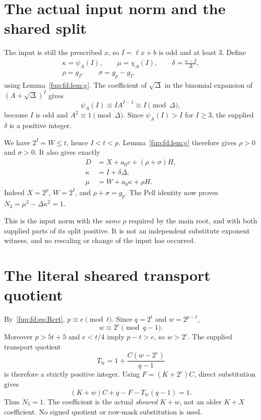 \documentclass[11pt,letterpaper]{article}
\theoremstyle{definition}\newtheorem{definition}[theorem]{Definition}
\theoremstyle{remark}\newtheorem{remark}[theorem]{Remark}
\newcommand{\tr}{T_{\mathrm{tr}}}\newcommand{\ma}{m_{\mathrm{aux}}}
\begin{document}
\section{The actual input norm and the shared split}\label{fup:fd:sec:input}
The input is still the prescribed $x$, so $I=\ell x+b$ is odd and at least 3. Define
\begin{equation}\label{fup:fd:eq:inputconstruction}
 \begin{gathered}
 \kappa=\psi_A(I),\qquad\mu=\chi_A(I),\qquad
 \delta=\frac{\kappa-I}{\Delta},\\
 \rho=g_I,\qquad\sigma=g_p-g_I,
 \end{gathered}
\end{equation}
using Lemma~\ref{fup:fd:lem:g}. The coefficient of $\sqrt\Delta$ in the binomial expansion of $(A+\sqrt\Delta)^I$ gives
\[
 \psi_A(I)\equiv I A^{I-1}\equiv I\pmod\Delta,
\]
because $I$ is odd and $A^2\equiv1\pmod\Delta$. Since $\psi_A(I)>I$ for $I\ge3$, the supplied $\delta$ is a positive integer.

We have $2^I=W\le t$, hence $I<t<p$. Lemma~\ref{fup:fd:lem:g} therefore gives $\rho>0$ and $\sigma>0$. It also gives exactly
\begin{align}\label{fup:fd:eq:inputidentities}
 D&=X+a_0c+(\rho+\sigma)H,\\
 \kappa&=I+\delta\Delta,\nonumber\\
 \mu&=W+a_0\kappa+\rho H.\nonumber
\end{align}
Indeed $X=2^p$, $W=2^I$, and $\rho+\sigma=g_p$. The Pell identity now proves $N_3=\mu^2-\Delta\kappa^2=1$.

This is the input norm with the \emph{same} $\rho$ required by the main root, and with both supplied parts of its split positive. It is not an independent substitute exponent witness, and no rescaling or change of the input has occurred.

\section{The literal sheared transport quotient}\label{fup:fd:sec:transport}
By~\eqref{fup:fd:eq:Rcrt}, $p\equiv e\pmod t$. Since $q=2^t$ and $w=2^{p-t}$,
\[
 w\equiv2^e\pmod{q-1}.
\]
Moreover $p>5t+5$ and $e<t/4$ imply $p-t>e$, so $w>2^e$. The supplied transport quotient
\begin{equation}\label{fup:fd:eq:tr}
 \tr=1+\frac{C(w-2^e)}{q-1}
\end{equation}
is therefore a strictly positive integer. Using $F=(K+2^e)C$, direct substitution gives
\[
 (K+w)C+q-F-\tr(q-1)=1.
\]
Thus $N_5=1$. The coefficient is the actual \emph{sheared} $K+w$, not an older $K+X$ coefficient. No signed quotient or raw-mask substitution is used.
\end{document}
